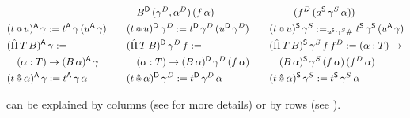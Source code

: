 \documentclass[a4paper,UKenglish,cleveref, autoref]{lipics-v2019}
\begin{document}
\begin{definition}
\begin{alignat*}{10}
    & && && \hspace{1em}  B^\D\,(\gamma^D,\alpha^D)\,(f\,\alpha) && && \hspace{1em}\hphantom{B^\S\,}(f^D\,(a^\S\,\gamma^S\,\alpha)) \\
    & (t\oldapp u)^\A\,\gamma := t^\A\,\gamma\,(u^\A\,\gamma) && &&  (t\oldapp u)^\D\,\gamma^D := t^\D\,\gamma^D\,(u^\D\,\gamma^D) && &&  (t\oldapp u)^\S\,\gamma^S := _{u^\S\,\gamma^S \#} t^\S\,\gamma^\S\,(u^\A\,\gamma) \\
    & (\Pim\,T\,B)^\A\,\gamma := && && (\Pim\,T\,B)^\D\,\gamma^D\,f := && && (\Pim\,T\,B)^\S\,\gamma^S\,f\,f^D := (\alpha:T)\ra \\
    & \hspace{1em} (\alpha:T)\ra(B\,\alpha)^\A\,\gamma && && \hspace{1em} (\alpha:T)\ra(B\,\alpha)^\D\,\gamma^D\,(f\,\alpha) && && \hspace{1em} (B\,\alpha)^\S\,\gamma^S\,(f\,\alpha)\,(f^D\,\alpha) \\
    & (t\appm \alpha)^\A\,\gamma := t^\A\,\gamma\,\alpha && && (t\appm \alpha)^\D\,\gamma^D := t^\D\,\gamma^D\,\alpha && && (t\appm \alpha)^\S\,\gamma^S := t^\S\,\gamma^S\,\alpha
  \end{alignat*}
\end{definition}
 can be explained by columns (see
\cite[Sections 4 and 6]{Kaposi:2019:CQI:3302515.3290315} for more details) or by rows
(see \cite[Section 7.4]{Kaposi:2019:CQI:3302515.3290315}).
\end{document}
